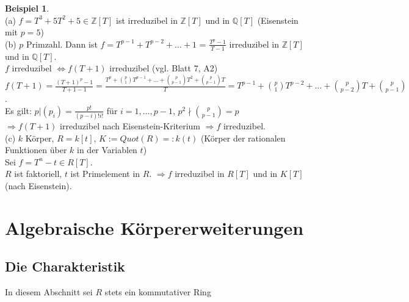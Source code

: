 \documentclass[10pt,a4paper,numbers=endperiod]{scrreprt}
\theoremstyle{definition}
\newtheorem{bsp}[satz]{Beispiel}
\def\QQ{{\mathbb Q}}
\def\ZZ{{\mathbb Z}}
\begin{document}
\begin{bsp}
	$ $\\
	(a) $f = T^3 + 5T^2 + 5 \in \ZZ[T]$ ist irreduzibel in $\ZZ[T]$ und in $\QQ[T]$ (Eisenstein mit $p = 5$)\\
	(b) $p$ Primzahl. Dann ist $f = T^{p-1} + T^{p-2} + \ldots + 1$ = $\frac{T^p-1}{T-1}$ irreduzibel in $\ZZ[T]$ und in $\QQ[T]$.\\
	$f$ irreduzibel $\Leftrightarrow f(T+1)$ irreduzibel (vgl. Blatt 7, A2)\\
	$f(T+1) = \frac{(T+1)^p -1}{T+1-1} = \frac{T^p + \binom{p}{1} T^{p-1} + \ldots + \binom{p}{p-1} T^2 + \binom{p}{p-1} T}{T} = T^{p-1} + \binom{p}{1}T^{p-2} + \ldots + \binom{p}{p-2}T + \binom{p}{p-1}$.\\
	 Es gilt: $p|(p_i) = \frac{p!}{(p-i)! i!}$ für $i = 1, \ldots, p-1$, $p^2 \nmid \binom{p}{p-1} = p$\\
	 $\Rightarrow f(T+1)$ irreduzibel nach Eisenstein-Kriterium $\Rightarrow f$ irreduzibel.\\
	 (c) $k$ Körper, $R = k[t]$, $K := Quot(R) =: k(t)$ (Körper der rationalen Funktionen über $k$ in der Variablen $t$)\\
	 Sei $f = T^n- t \in R[T]$.\\
	 $R$ ist faktoriell, $t$ ist Primelement in $R$. $\Rightarrow f$ irreduzibel in $R[T]$ und in $K[T]$ (nach Eisenstein).
\end{bsp}

\part{Algebraische Körpererweiterungen}

\chapter{Die Charakteristik} 

In diesem Abschnitt sei $R$ stets ein kommutativer Ring\\
\end{document}
